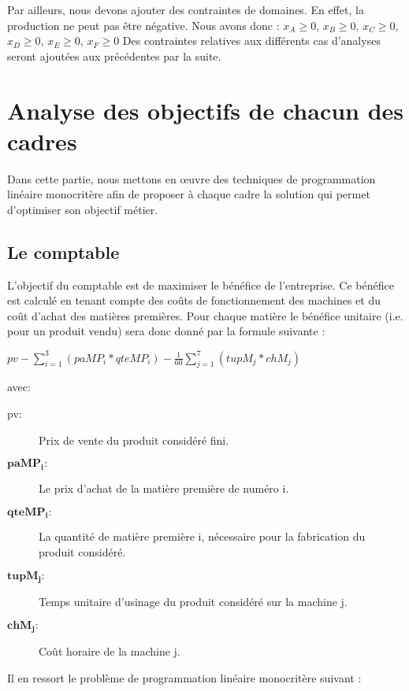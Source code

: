 \documentclass[12pt]{article}
\begin{document}
Par ailleurs, nous devons ajouter des contraintes de domaines. En effet, la production ne peut pas être négative. Nous avons donc :
$ x_{A} \geq 0$, $x_{B}  \geq 0$, $x_{C} \geq 0$, $x_{D} \geq 0$, $x_{E} \geq 0$, $x_{F} \geq 0 $
Des contraintes relatives aux différents cas d'analyses seront ajoutées aux précédentes par la suite.
\section{Analyse des objectifs de chacun des cadres}
Dans cette partie, nous mettons en œuvre des techniques de programmation linéaire monocritère afin de proposer à chaque cadre la solution qui permet d'optimiser son objectif métier.
\subsection{Le comptable}
L'objectif du comptable est de maximiser le bénéfice de l'entreprise. Ce bénéfice est calculé en tenant compte des coûts de fonctionnement des machines et du coût d'achat des matières premières. Pour chaque matière le bénéfice unitaire (i.e. pour un produit vendu) sera donc donné par la formule suivante : \begin{center} $pv - \sum_{i=1}^{3}(paMP_{i} * qteMP_{i}) - \frac{1}{60} \sum_{j=1}^{7}(tupM_{j} * chM_{j}) $ \end{center} avec: \newline 
\begin{description}
\item[pv: ]Prix de vente du produit considéré fini.
\item[$\mathbf{paMP_{i} :}$] Le prix d'achat de la matière première de numéro i.
\item[$\mathbf{qteMP_{i} :}$] La quantité de matière première i, nécessaire pour la fabrication du produit considéré.
\item[$\mathbf{tupM_{j} :}$] Temps unitaire d'usinage du produit considéré sur la machine j.
\item[$\mathbf{chM_{j} :}$] Coût horaire de la machine j.
\end{description}
Il en ressort le problème de programmation linéaire monocritère suivant : \newline 
\\
\noindent{}
\end{document}
